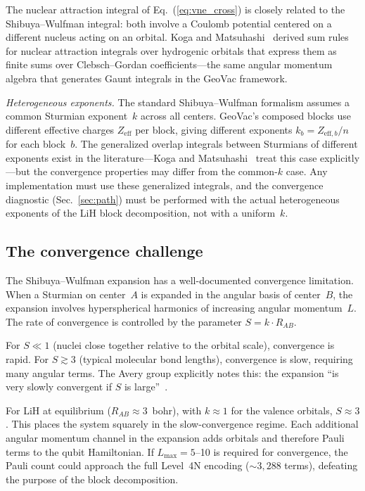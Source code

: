 \documentclass[aps,pra,twocolumn,superscriptaddress,longbibliography]{revtex4-2}
\begin{document}
The nuclear attraction integral of Eq.~(\ref{eq:vne_cross}) is
closely related to the Shibuya--Wulfman integral: both involve a
Coulomb potential centered on a different nucleus acting on an orbital.
Koga and Matsuhashi~\cite{koga1987} derived sum rules for nuclear
attraction integrals over hydrogenic orbitals that express them as
finite sums over Clebsch--Gordan coefficients---the same angular
momentum algebra that generates Gaunt integrals in the GeoVac
framework.

\emph{Heterogeneous exponents.}  The standard Shibuya--Wulfman
formalism assumes a common Sturmian exponent~$k$ across all centers.
GeoVac's composed blocks use different effective charges
$Z_{\mathrm{eff}}$ per block, giving different exponents
$k_b = Z_{\mathrm{eff},b}/n$ for each block~$b$.  The generalized
overlap integrals between Sturmians of different exponents exist in
the literature---Koga and Matsuhashi~\cite{koga1987} treat this
case explicitly---but the convergence properties may differ from the
common-$k$ case.  Any implementation must use these generalized
integrals, and the convergence diagnostic (Sec.~\ref{sec:path})
must be performed with the actual heterogeneous exponents of the
LiH block decomposition, not with a uniform~$k$.

\subsection{The convergence challenge}

The Shibuya--Wulfman expansion has a well-documented convergence
limitation.  When a Sturmian on center~$A$ is expanded in the
angular basis of center~$B$, the expansion involves hyperspherical
harmonics of increasing angular momentum~$L$.  The rate of convergence
is controlled by the parameter $S = k \cdot R_{AB}$.

For $S \ll 1$ (nuclei close together relative to the orbital scale),
convergence is rapid.  For $S \gtrsim 3$ (typical molecular bond
lengths), convergence is slow, requiring many angular terms.  The
Avery group explicitly notes this: the expansion ``is very slowly
convergent if $S$ is large''~\cite{avery2012}.

For LiH at equilibrium ($R_{AB} \approx 3$~bohr), with $k \approx 1$
for the valence orbitals, $S \approx 3$.  This places the system
squarely in the slow-convergence regime.  Each additional angular
momentum channel in the expansion adds orbitals and therefore Pauli
terms to the qubit Hamiltonian.  If $L_{\max} = 5$--10 is required
for convergence, the Pauli count could approach the full Level~4N
encoding (${\sim}3{,}288$ terms), defeating the purpose of the block
decomposition.
\end{document}
